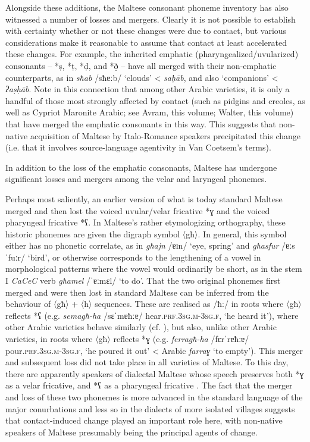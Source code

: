 \documentclass[output=paper]{langsci/langscibook}
\begin{document}
 \label{mergers}
Alongside these additions, the Maltese consonant phoneme inventory has also witnessed a number of losses and mergers. Clearly it is not possible to establish with certainty whether or not these changes were due to contact, but various considerations make it reasonable to assume that contact at least accelerated these changes. For example, the inherited emphatic (pharyngealized/uvularized) consonants -- *\d{s}, *\d{t}, *\d{d}, and *\d{ð} -- have all merged with their non-emphatic counterparts, as in \textit{sħab} /sħɐːb/ `clouds' < \textit{sa\d{h}\={a}b}, and also `companions' < \textit{ʔa\d{s}\d{h}\={a}b}. Note in this connection that among other Arabic varieties, it is only a handful of those most strongly affected by contact (such as pidgins and creoles, as well as Cypriot Maronite Arabic; see Avram, this volume; Walter, this volume) that have merged the emphatic consonants in this way. This suggests that non-native acquisition of Maltese by Italo-Romance speakers precipitated this change (i.e. that it involves source-language agentivity in Van Coetsem's \citeyear{VanCoetsem1988,VanCoetsem2000} terms).

In addition to the loss of the emphatic consonants, Maltese has undergone significant losses and mergers among the velar and laryngeal phonemes. 

Perhaps most saliently, an earlier version of what is today standard Maltese merged and then lost the voiced uvular/velar fricative *ɣ and the voiced pharyngeal fricative *ʕ. In Maltese's rather etymologizing orthography, these historic phonemes are given the digraph symbol 〈għ〉. In general, this symbol either has no phonetic correlate, as in \textit{għajn} /ɐɪn/ `eye, spring' and \textit{għasfur} /ɐːsˈfuːr/ `bird', or otherwise corresponds to the lengthening of a vowel in morphological patterns where the vowel would ordinarily be short, as in the stem I \textit{CaCeC} verb \textit{għamel} /ˈɐːmɛl/ `to do'. That the two original phonemes first merged and were then lost in standard Maltese can be inferred from the behaviour of 〈għ〉 + 〈h〉 sequences. These are realised as /ħː/ in roots where 〈għ〉 reflects *ʕ (e.g. \textit{semagħ-ha} /sɛˈmɐħːɐ/ hear.\textsc{prf.3sg.m-3sg.f}, `he heard it'), where other Arabic varieties behave similarly (cf. \citealt[18] {Woidich2006}), but also, unlike other Arabic varieties, in roots where 〈għ〉 reflects *ɣ (e.g. \textit{ferragħ-ha} /fɛrˈrɐħːɐ/ pour.\textsc{prf.3sg.m-3sg.f}, `he poured it out' < Arabic \textit{farraɣ} `to empty'). This merger and subsequent loss did not take place in all varieties of Maltese. To this day, there are apparently speakers of dialectal Maltese whose speech preserves both *ɣ as a velar fricative, and *ʕ as a pharyngeal fricative \citep{klimiuk2017}. The fact that the merger and loss of these two phonemes is more advanced in the standard language of the major conurbations and less so in the dialects of more isolated villages suggests that contact-induced change played an important role here, with non-native speakers of Maltese presumably being the principal agents of change. 
\end{document}
